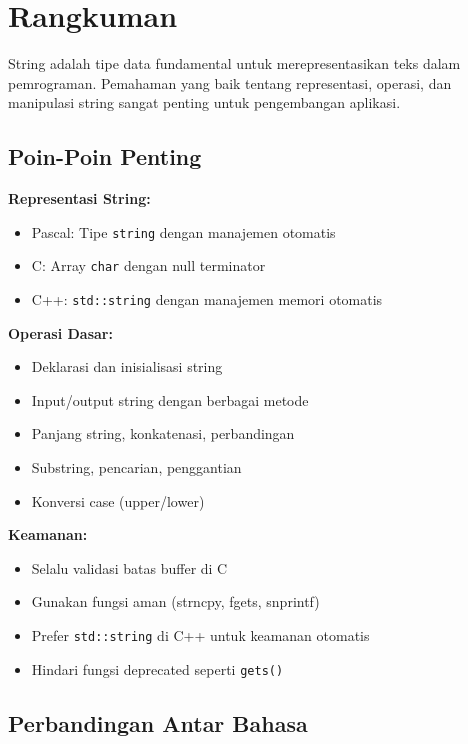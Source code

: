 \documentclass[../main.tex]{subfiles}
\begin{document}
\section{Rangkuman}

String adalah tipe data fundamental untuk merepresentasikan teks dalam pemrograman. Pemahaman yang baik tentang representasi, operasi, dan manipulasi string sangat penting untuk pengembangan aplikasi.

\subsection{Poin-Poin Penting}

\textbf{Representasi String:}
\begin{itemize}
  \item Pascal: Tipe \texttt{string} dengan manajemen otomatis
  \item C: Array \texttt{char} dengan null terminator
  \item C++: \texttt{std::string} dengan manajemen memori otomatis
\end{itemize}

\textbf{Operasi Dasar:}
\begin{itemize}
  \item Deklarasi dan inisialisasi string
  \item Input/output string dengan berbagai metode
  \item Panjang string, konkatenasi, perbandingan
  \item Substring, pencarian, penggantian
  \item Konversi case (upper/lower)
\end{itemize}

\textbf{Keamanan:}
\begin{itemize}
  \item Selalu validasi batas buffer di C
  \item Gunakan fungsi aman (strncpy, fgets, snprintf)
  \item Prefer \texttt{std::string} di C++ untuk keamanan otomatis
  \item Hindari fungsi deprecated seperti \texttt{gets()}
\end{itemize}

\subsection{Perbandingan Antar Bahasa}
\end{document}
